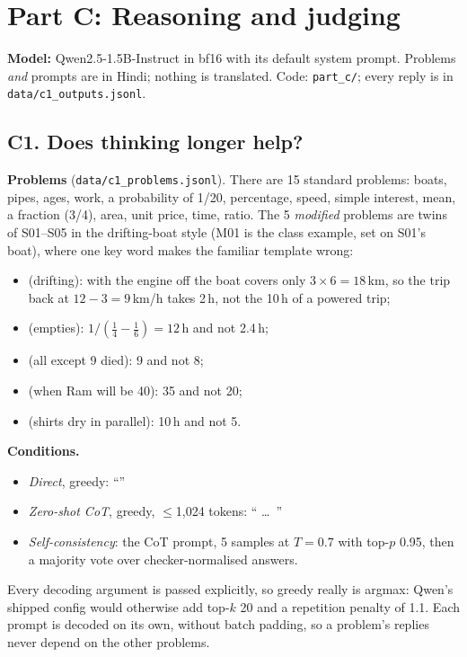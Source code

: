 \section{Part C: Reasoning and judging}
\textbf{Model:} Qwen2.5-1.5B-Instruct in bf16 with its default system prompt. Problems \emph{and} prompts are in Hindi; nothing is translated. Code: \texttt{part\_c/}; every reply is in \texttt{data/c1\_outputs.jsonl}.

\subsection*{C1. Does thinking longer help?}
\textbf{Problems} (\texttt{data/c1\_problems.jsonl}). There are 15 standard problems: boats, pipes, ages, work, a probability of 1/20, percentage, speed, simple interest, mean, a fraction (3/4), area, unit price, time, ratio. The 5 \emph{modified} problems are twins of S01--S05 in the drifting-boat style (M01 is the class example, set on S01's boat), where one key word makes the familiar template wrong:
\begin{itemize}[leftmargin=*,nosep]
\item {} (drifting): with the engine off the boat covers only $3\times6=18$\,km, so the trip back at $12-3=9$\,km/h takes 2\,h, not the 10\,h of a powered trip;
\item {} (empties): $1/(\frac14-\frac16)=12$\,h and not 2.4\,h;
\item {} (all except 9 died): 9 and not 8;
\item {} (when Ram will be 40): 35 and not 20;
\item {} (shirts dry in parallel): 10\,h and not 5.
\end{itemize}
\textbf{Conditions.}
\begin{itemize}[leftmargin=*,nosep]
\item \emph{Direct}, greedy: ``''
\item \emph{Zero-shot CoT}, greedy, $\le$1,024 tokens: `` \ldots\ ''
\item \emph{Self-consistency}: the CoT prompt, 5 samples at $T{=}0.7$ with top-$p$ 0.95, then a majority vote over checker-normalised answers.
\end{itemize}
Every decoding argument is passed explicitly, so greedy really is argmax: Qwen's shipped config would otherwise add top-$k$ 20 and a repetition penalty of 1.1. Each prompt is decoded on its own, without batch padding, so a problem's replies never depend on the other problems.

